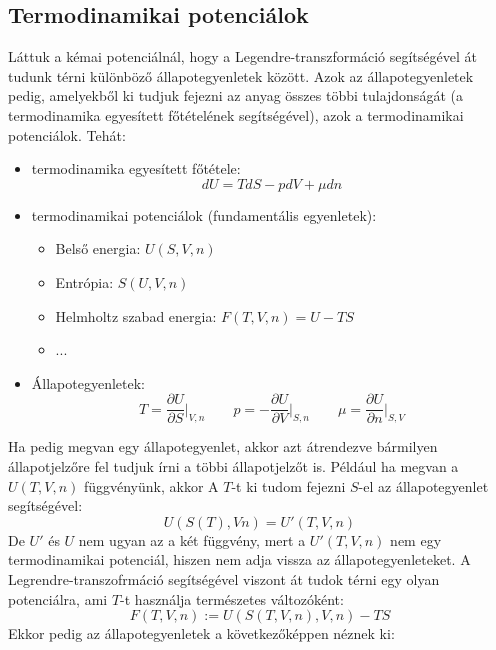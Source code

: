 \documentclass[../main.tex]{subfiles}
\begin{document}
\subsection{Termodinamikai potenciálok}
Láttuk a kémai potenciálnál, hogy a Legendre-transzformáció segítségével át tudunk térni különböző állapotegyenletek között. Azok az állapotegyenletek pedig,
amelyekből ki tudjuk fejezni az anyag összes többi tulajdonságát (a termodinamika egyesített főtételének segítségével), azok a termodinamikai potenciálok. Tehát:
\begin{itemize}
    \item termodinamika egyesített főtétele:
    \begin{equation}
        dU = T dS - p dV + \mu dn
    \end{equation}
    \item termodinamikai potenciálok (fundamentális egyenletek):
    \begin{itemize}
        \item Belső energia: $U(S, V, n)$
        \item Entrópia: $S(U, V, n)$
        \item Helmholtz szabad energia: $F(T, V, n) = U - T S$
        \item ...
    \end{itemize}
    \item Állapotegyenletek:
    \begin{equation}
        T = \frac{\partial U}{\partial S}\bigg|_{V,n} \qquad p = - \frac{\partial U}{\partial V}\bigg|_{S,n} \qquad \mu = \frac{\partial U}{\partial n}\bigg|_{S,V}
    \end{equation}
\end{itemize}
Ha pedig megvan egy állapotegyenlet, akkor azt átrendezve bármilyen állapotjelzőre fel tudjuk írni a többi állapotjelzőt is. Például ha megvan a $U(T,V,n)$ függvényünk, akkor
A $T$-t ki tudom fejezni $S$-el az állapotegyenlet segítségével:
\begin{equation}
    U(S(T), V n) = U'(T, V, n)
\end{equation}
De $U'$ és $U$ nem ugyan az a két függvény, mert a $U'(T, V, n)$ nem egy termodinamikai potenciál, hiszen nem adja vissza az állapotegyenleteket. 
A Legrendre-transzofrmáció segítségével viszont át tudok térni egy olyan potenciálra, ami $T$-t használja természetes változóként:
\begin{equation}
    F(T, V, n) := U(S(T, V, n), V, n) - T S
\end{equation}
Ekkor pedig az állapotegyenletek a következőképpen néznek ki:
\end{document}
